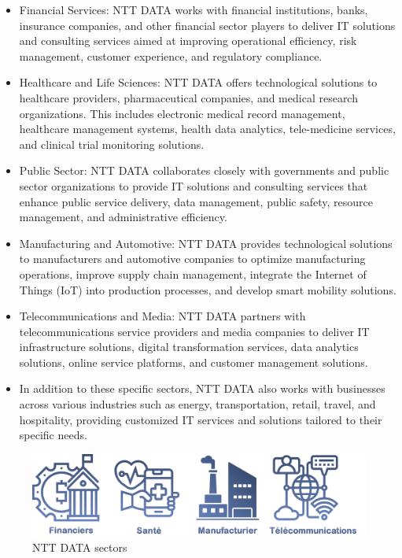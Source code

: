 \documentclass[12pt,a4paper,table,english]{article}
\begin{document}
	\begin{itemize}
		\item Financial Services: NTT DATA works with financial institutions, banks, insurance companies, and other financial sector players to deliver IT solutions and consulting services aimed at improving operational efficiency, risk management, customer experience, and regulatory compliance.
		
		\item Healthcare and Life Sciences: NTT DATA offers technological solutions to healthcare providers, pharmaceutical companies, and medical research organizations. This includes electronic medical record management, healthcare management systems, health data analytics, tele-medicine services, and clinical trial monitoring solutions.
		
		\item Public Sector: NTT DATA collaborates closely with governments and public sector organizations to provide IT solutions and consulting services that enhance public service delivery, data management, public safety, resource management, and administrative efficiency.
		
		\item Manufacturing and Automotive: NTT DATA provides technological solutions to manufacturers and automotive companies to optimize manufacturing operations, improve supply chain management, integrate the Internet of Things (IoT) into production processes, and develop smart mobility solutions.
		
		\item Telecommunications and Media: NTT DATA partners with telecommunications service providers and media companies to deliver IT infrastructure solutions, digital transformation services, data analytics solutions, online service platforms, and customer management solutions.
		
		\item In addition to these specific sectors, NTT DATA also works with businesses across various industries such as energy, transportation, retail, travel, and hospitality, providing customized IT services and solutions tailored to their specific needs.
	\end{itemize}
	
	\begin{figure}[h!]
		\centering
		\includegraphics[width=0.8\linewidth]{Image/nttsector.png}
		\caption{NTT DATA sectors}
		\label{fig:NTT DATA sectors}
	\end{figure}
	
\end{document}
